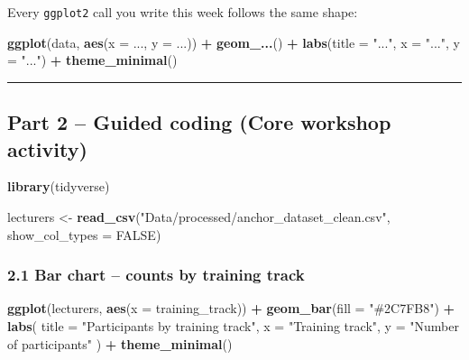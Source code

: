 \documentclass[11pt]{article}
\newenvironment{Shaded}{\begin{snugshade}}{\end{snugshade}}
\newcommand{\AttributeTok}[1]{\textcolor[rgb]{0.13,0.29,0.53}{#1}}
\newcommand{\ConstantTok}[1]{\textcolor[rgb]{0.56,0.35,0.01}{#1}}
\newcommand{\FunctionTok}[1]{\textcolor[rgb]{0.13,0.29,0.53}{\textbf{#1}}}
\newcommand{\NormalTok}[1]{#1}
\newcommand{\OtherTok}[1]{\textcolor[rgb]{0.56,0.35,0.01}{#1}}
\newcommand{\SpecialCharTok}[1]{\textcolor[rgb]{0.81,0.36,0.00}{\textbf{#1}}}
\newcommand{\StringTok}[1]{\textcolor[rgb]{0.31,0.60,0.02}{#1}}
\begin{document}
Every \texttt{ggplot2} call you write this week follows the same shape:

\begin{Shaded}
\begin{Highlighting}[]
\FunctionTok{ggplot}\NormalTok{(data, }\FunctionTok{aes}\NormalTok{(}\AttributeTok{x =}\NormalTok{ ..., }\AttributeTok{y =}\NormalTok{ ...)) }\SpecialCharTok{+}
  \FunctionTok{geom\_...}\NormalTok{() }\SpecialCharTok{+}
  \FunctionTok{labs}\NormalTok{(}\AttributeTok{title =} \StringTok{"..."}\NormalTok{, }\AttributeTok{x =} \StringTok{"..."}\NormalTok{, }\AttributeTok{y =} \StringTok{"..."}\NormalTok{) }\SpecialCharTok{+}
  \FunctionTok{theme\_minimal}\NormalTok{()}
\end{Highlighting}
\end{Shaded}

\begin{center}\rule{0.5\linewidth}{0.5pt}\end{center}

\hypertarget{part-2-guided-coding-core-workshop-activity}{%
\subsection{Part 2 -- Guided coding (Core workshop
activity)}\label{part-2-guided-coding-core-workshop-activity}}

\begin{Shaded}
\begin{Highlighting}[]
\FunctionTok{library}\NormalTok{(tidyverse)}

\NormalTok{lecturers }\OtherTok{\textless{}{-}} \FunctionTok{read\_csv}\NormalTok{(}\StringTok{"Data/processed/anchor\_dataset\_clean.csv"}\NormalTok{, }\AttributeTok{show\_col\_types =} \ConstantTok{FALSE}\NormalTok{)}
\end{Highlighting}
\end{Shaded}

\hypertarget{bar-chart-counts-by-training-track}{%
\subsubsection{2.1 Bar chart -- counts by training
track}\label{bar-chart-counts-by-training-track}}

\begin{Shaded}
\begin{Highlighting}[]
\FunctionTok{ggplot}\NormalTok{(lecturers, }\FunctionTok{aes}\NormalTok{(}\AttributeTok{x =}\NormalTok{ training\_track)) }\SpecialCharTok{+}
  \FunctionTok{geom\_bar}\NormalTok{(}\AttributeTok{fill =} \StringTok{"\#2C7FB8"}\NormalTok{) }\SpecialCharTok{+}
  \FunctionTok{labs}\NormalTok{(}
    \AttributeTok{title =} \StringTok{"Participants by training track"}\NormalTok{,}
    \AttributeTok{x =} \StringTok{"Training track"}\NormalTok{, }\AttributeTok{y =} \StringTok{"Number of participants"}
\NormalTok{  ) }\SpecialCharTok{+}
  \FunctionTok{theme\_minimal}\NormalTok{()}
\end{Highlighting}
\end{Shaded}
\end{document}
